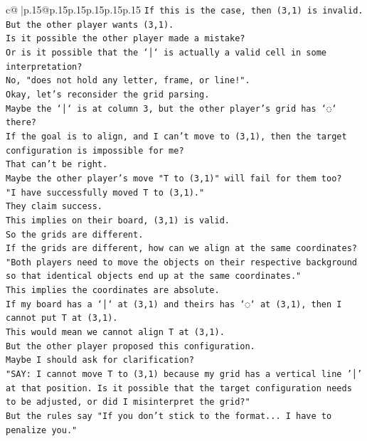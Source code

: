 \documentclass{article}
\begin{document}
{\begin{supertabular}{c@{$\;$}|p{.15\linewidth}@{}p{.15\linewidth}p{.15\linewidth}p{.15\linewidth}p{.15\linewidth}p{.15\linewidth}}
{{{\texttt{If this is the case, then (3,1) is invalid.} \\
\texttt{But the other player wants (3,1).} \\
\texttt{Is it possible the other player made a mistake?} \\
\texttt{Or is it possible that the `│` is actually a valid cell in some interpretation?} \\
\texttt{No, "does not hold any letter, frame, or line!".} \\
\texttt{Okay, let's reconsider the grid parsing.} \\
\texttt{Maybe the `│` is at column 3, but the other player's grid has `◌` there?} \\
\texttt{If the goal is to align, and I can't move to (3,1), then the target configuration is impossible for me?} \\
\texttt{That can't be right.} \\
\texttt{Maybe the other player's move "T to (3,1)" will fail for them too?} \\
\texttt{"I have successfully moved T to (3,1)."} \\
\texttt{They claim success.} \\
\texttt{This implies on their board, (3,1) is valid.} \\
\texttt{So the grids are different.} \\
\texttt{If the grids are different, how can we align at the same coordinates?} \\
\texttt{"Both players need to move the objects on their respective background so that identical objects end up at the same coordinates."} \\
\texttt{This implies the coordinates are absolute.} \\
\texttt{If my board has a `│` at (3,1) and theirs has `◌` at (3,1), then I cannot put T at (3,1).} \\
\texttt{This would mean we cannot align T at (3,1).} \\
\texttt{But the other player proposed this configuration.} \\
\texttt{Maybe I should ask for clarification?} \\
\texttt{"SAY: I cannot move T to (3,1) because my grid has a vertical line '│' at that position. Is it possible that the target configuration needs to be adjusted, or did I misinterpret the grid?"} \\
\texttt{But the rules say "If you don't stick to the format... I have to penalize you."} \\
}}}
\end{supertabular}}
\end{document}
